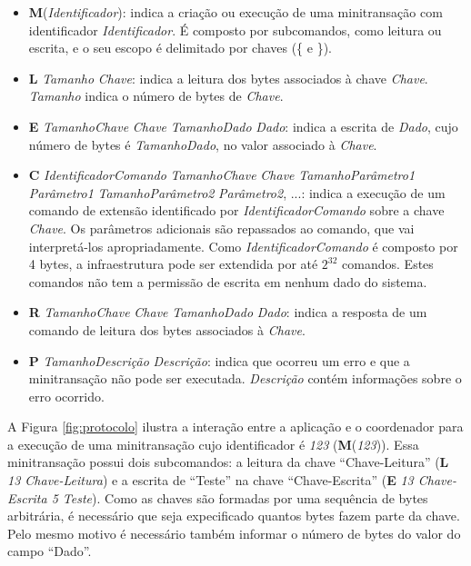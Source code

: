 \documentclass[11pt,twoside,a4paper]{book}
\begin{document}
\begin{itemize}
    \item \textbf{M}(\textit{Identificador}): indica a criação ou execução de uma minitransação com identificador \textit{Identificador}. É composto por subcomandos, como leitura ou escrita, e o seu escopo é delimitado por chaves (\{ e \}).

    \item \textbf{L} \textit{Tamanho} \textit{Chave}: indica a leitura dos bytes associados à chave \textit{Chave}. \textit{Tamanho} indica o número de bytes de \textit{Chave}.

    \item \textbf{E} \textit{TamanhoChave} \textit{Chave} \textit{TamanhoDado} \textit{Dado}: indica a escrita de \textit{Dado}, cujo número de bytes é \textit{TamanhoDado}, no valor associado à \textit{Chave}.

    \item \textbf{C} \textit{IdentificadorComando} \textit{TamanhoChave} \textit{Chave} \textit{TamanhoParâmetro1} \textit{Parâmetro1} \textit{TamanhoParâmetro2} \textit{Parâmetro2}, ...: indica a execução de um comando de extensão identificado por \textit{IdentificadorComando} sobre a chave \textit{Chave}. Os parâmetros adicionais são repassados ao comando, que vai interpretá-los apropriadamente. Como \textit{IdentificadorComando} é composto por 4 bytes, a infraestrutura pode ser extendida por até $2^{32}$ comandos. Estes comandos não tem a permissão de escrita em nenhum dado do sistema.

    \item \textbf{R} \textit{TamanhoChave} \textit{Chave} \textit{TamanhoDado} \textit{Dado}: indica a resposta de um comando de leitura dos bytes associados à \textit{Chave}.

    \item \textbf{P} \textit{TamanhoDescrição} \textit{Descrição}: indica que ocorreu um erro e que a minitransação não pode ser executada. \textit{Descrição} contém informações sobre o erro ocorrido.
\end{itemize}

A Figura \ref{fig:protocolo} ilustra a interação entre a aplicação e o coordenador para a execução de uma minitransação cujo identificador é \textit{123} (\textbf{M}(\textit{123})). Essa minitransação possui dois subcomandos: a leitura da chave ``Chave-Leitura'' (\textbf{L} \textit{13 Chave-Leitura}) e a escrita de ``Teste'' na chave ``Chave-Escrita'' (\textbf{E} \textit{13 Chave-Escrita 5 Teste}). Como as chaves são formadas por uma sequência de bytes arbitrária, é necessário que seja expecificado quantos bytes fazem parte da chave. Pelo mesmo motivo é necessário também informar o número de bytes do valor do campo ``Dado''.
\end{document}
